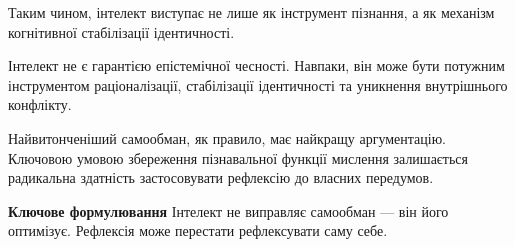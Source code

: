 \documentclass[12pt,a4paper]{article}
\begin{document}
Таким чином, інтелект виступає не лише як інструмент пізнання, а як механізм когнітивної стабілізації ідентичності.

Інтелект не є гарантією епістемічної чесності. Навпаки, він може бути потужним інструментом раціоналізації, стабілізації ідентичності та уникнення внутрішнього конфлікту.

Найвитонченіший самообман, як правило, має найкращу аргументацію. Ключовою умовою збереження пізнавальної функції мислення залишається радикальна здатність застосовувати рефлексію до власних передумов.

\textbf{Ключове формулювання}  
Інтелект не виправляє самообман — він його оптимізує.  
Рефлексія може перестати рефлексувати саму себе.



\end{document}
